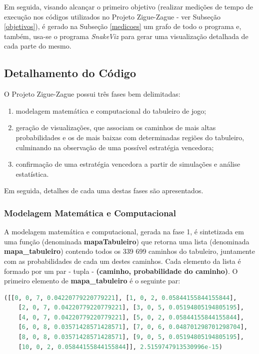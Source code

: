 \documentclass[12pt]{article}
\begin{document}
Em seguida, visando alcançar o primeiro objetivo (realizar medições de tempo de execução nos códigos utilizados no Projeto Zigue-Zague - ver Subseção \ref{objetivos}), é gerado na Subseção \ref{medicoes} um grafo de todo o programa e, também, usa-se o programa \textit{SnakeViz} para gerar uma visualização detalhada de cada parte do mesmo.

\subsection{Detalhamento do Código}
\label{detalhamento}

O Projeto Zigue-Zague possui três fases bem delimitadas: 

\begin{enumerate}
	\item modelagem matemática e computacional do tabuleiro de jogo; 
	\item geração de visualizações, que associam os caminhos de mais altas probabilidades e os de mais baixas com determinadas regiões do tabuleiro, culminando na observação de uma possível estratégia vencedora; 
	\item confirmação de uma estratégia vencedora a partir de simulações e análise estatística.
\end{enumerate} 

Em seguida, detalhes de cada uma destas fases são apresentados.

\subsubsection{Modelagem Matemática e Computacional}

A modelagem matemática e computacional, gerada na fase 1, é sintetizada em uma função (denominada \textbf{mapaTabuleiro}) que retorna uma lista (denominada \textbf{mapa\_tabuleiro}) contendo todos os 339 699 caminhos do tabuleiro, juntamente com as probabilidades de cada um destes caminhos. Cada elemento da lista é formado por um par - tupla - \textbf{(caminho, probabilidade do caminho)}. O primeiro elemento de \textbf{mapa\_tabuleiro} é o seguinte par:

\begin{lstlisting}[language=Python]
([[0, 0, 7, 0.04220779220779221], [1, 0, 2, 0.05844155844155844], 
	[2, 0, 7, 0.04220779220779221], [3, 0, 5, 0.05194805194805195],
	[4, 0, 7, 0.04220779220779221], [5, 0, 2, 0.05844155844155844], 
	[6, 0, 8, 0.03571428571428571], [7, 0, 6, 0.048701298701298704], 
	[8, 0, 8, 0.03571428571428571], [9, 0, 5, 0.05194805194805195], 
	[10, 0, 2, 0.05844155844155844]], 2.5159747913530996e-15)
\end{lstlisting}
\end{document}
